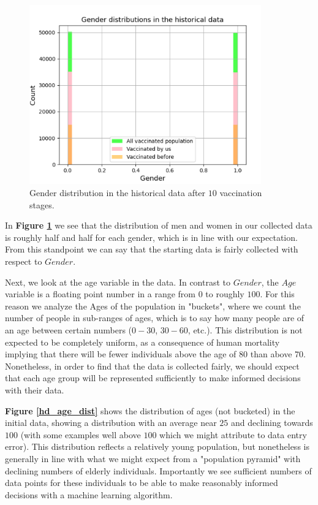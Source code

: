 \documentclass{article}
\begin{document}
\begin{figure}[H]
    \centering
    \includegraphics[width=10cm]{hd_gender_dist_version2.png}
    \caption{Gender distribution in the historical data after $10$ vaccination stages.}
    \label{hd_gender_dist}
\end{figure}

In \textbf{Figure \ref{hd_gender_dist}} we see that the distribution of men and women in our collected data is roughly half and half for each gender, which is in line with our expectation. From this standpoint we can say that the starting data is fairly collected with respect to $Gender$.

Next, we look at the age variable in the data. In contrast to $Gender$, the $Age$ variable is a floating point number in a range from $0$ to roughly $100$. For this reason we analyze the Ages of the population in "buckets", where we count the number of people in sub-ranges of ages, which is to say how many people are of an age between certain numbers ($0-30$, $30-60$, etc.). This distribution is not expected to be completely uniform, as a consequence of human mortality implying  that there will be fewer individuals above the age of $80$ than above $70$. Nonetheless, in order to find that the data is collected fairly, we should expect that each age group will be represented sufficiently to make informed decisions with their data. 

\textbf{Figure \ref{hd_age_dist}} shows the distribution of ages (not bucketed) in the initial data, showing a distribution with an average near $25$ and declining towards $100$ (with some examples well above $100$ which we might attribute to data entry error). This distribution reflects a relatively young population, but nonetheless is generally in line with what we might expect from a "population pyramid" with declining numbers of elderly individuals. Importantly we see sufficient numbers of data points for these individuals to be able to make reasonably informed decisions with a machine learning algorithm.
\end{document}
